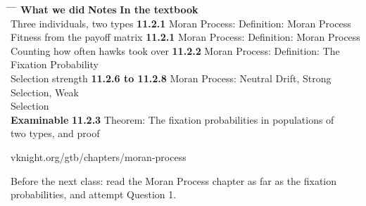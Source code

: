\hspace{0.3cm}
\begin{minipage}{0.95\linewidth}
\begin{tabbing}
\hspace{6.9cm} \= \hspace{3.0cm} \= \hspace{9.4cm} \= \kill
\textbf{What we did} \> {\color{inkteal}\textbf{Notes}} \> \textbf{In the textbook} \>
  \\[0.5em]
Three individuals, two types \> {\color{inkteal}\textbf{11.2.1}} \> Moran Process:
  Definition: Moran Process \> \\[0.45em]
Fitness from the payoff matrix \> {\color{inkteal}\textbf{11.2.1}} \> Moran Process:
  Definition: Moran Process \> \\[0.45em]
Counting how often hawks took over \> {\color{inkteal}\textbf{11.2.2}} \> Moran
  Process: Definition: The Fixation Probability \> \\[0.45em]
Selection strength \> {\color{inkteal}\textbf{11.2.6 to 11.2.8}} \> Moran Process:
  Neutral Drift, Strong Selection, Weak \> \\
\> \> Selection \> \\[0.45em]
\textbf{Examinable} \> {\color{inkteal}\textbf{11.2.3}} \> Theorem: The fixation
  probabilities in populations of \> \\
\> \> two types, and proof \> 
\end{tabbing}
\end{minipage}

\vspace{0.45cm}

{\color{inkgrey} vknight.org/gtb/chapters/moran-process}

\vspace{0.3cm}

{\large Before the next class: read the Moran Process chapter as far as the fixation
  probabilities, and attempt Question 1.}


